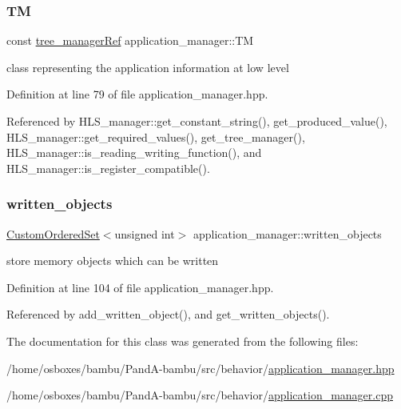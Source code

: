 \subsubsection{\texorpdfstring{TM}{TM}}
{\footnotesize\ttfamily const \hyperlink{tree__manager_8hpp_a96ff150c071ce11a9a7a1e40590f205e}{tree\+\_\+manager\+Ref} application\+\_\+manager\+::\+TM\hspace{0.3cm}{\ttfamily [protected]}}



class representing the application information at low level 



Definition at line 79 of file application\+\_\+manager.\+hpp.



Referenced by H\+L\+S\+\_\+manager\+::get\+\_\+constant\+\_\+string(), get\+\_\+produced\+\_\+value(), H\+L\+S\+\_\+manager\+::get\+\_\+required\+\_\+values(), get\+\_\+tree\+\_\+manager(), H\+L\+S\+\_\+manager\+::is\+\_\+reading\+\_\+writing\+\_\+function(), and H\+L\+S\+\_\+manager\+::is\+\_\+register\+\_\+compatible().

\mbox{\label{classapplication__manager_a5bb93bca164a497e970fec39ec1999dc}} 
\subsubsection{\texorpdfstring{written\+\_\+objects}{written\_objects}}
{\footnotesize\ttfamily \hyperlink{classCustomOrderedSet}{Custom\+Ordered\+Set}$<$unsigned int$>$ application\+\_\+manager\+::written\+\_\+objects\hspace{0.3cm}{\ttfamily [protected]}}



store memory objects which can be written 



Definition at line 104 of file application\+\_\+manager.\+hpp.



Referenced by add\+\_\+written\+\_\+object(), and get\+\_\+written\+\_\+objects().



The documentation for this class was generated from the following files\+:\begin{DoxyCompactItemize}
\item 
/home/osboxes/bambu/\+Pand\+A-\/bambu/src/behavior/\hyperlink{application__manager_8hpp}{application\+\_\+manager.\+hpp}\item 
/home/osboxes/bambu/\+Pand\+A-\/bambu/src/behavior/\hyperlink{application__manager_8cpp}{application\+\_\+manager.\+cpp}\end{DoxyCompactItemize}

